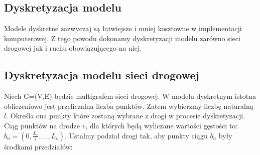 \documentclass[11pt]{IEEEtran}
\begin{document}
\subsection{Dyskretyzacja modelu}
Modele dyskretne zazwyczaj są łatwiejsze i mniej kosztowne w implementacji komputerowej. Z tego powodu dokonamy dyskretyzacji modelu zarówno sieci drogowej jak i ruchu obowiązującego na niej.
\subsection{Dyskretyzacja modelu sieci drogowej}
Niech G=(V,E) będzie multigrafem sieci drogowej. W modelu dyskretnym istotna obliczeniowo jest przeliczalna liczba punktów. Zatem wybierzmy liczbę naturalną $l$. Określa ona punkty które zostaną wybrane z drogi w procesie dyskretyzacji. Ciąg punktów na drodze $v$, dla których będą wyliczane wartości gęstości to: $b_n=(0,\frac{L_v}{l},...,L_v)$. Ustalmy podział drogi tak, aby punkty ciągu $b_n$ były środkami przedziałów:
\end{document}
